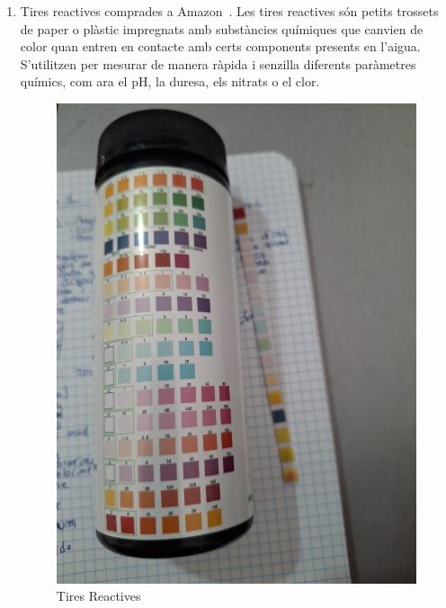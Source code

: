 \begin{enumerate}
 \item
  Tires reactives comprades a Amazon~\cite{tiresReactives}. Les tires reactives són petits trossets de paper o plàstic impregnats amb substàncies químiques que canvien de color quan entren en contacte amb certs components presents en l’aigua. S’utilitzen per mesurar de manera ràpida i senzilla diferents paràmetres químics, com ara el pH, la duresa, els nitrats o el clor.

  \begin{minipage}[h]{0.45\textwidth}
  \begin{figure}[H]
      \centering
      \includegraphics[width=1\textwidth, angle=270]{./Figures/TIres.png}
      \caption{Tires Reactives}
      \label{fig:TiresReactives}
    \end{figure}
  \end{minipage}
  \begin{minipage}[h]{0.45\textwidth}

\end{minipage}
\end{enumerate}
